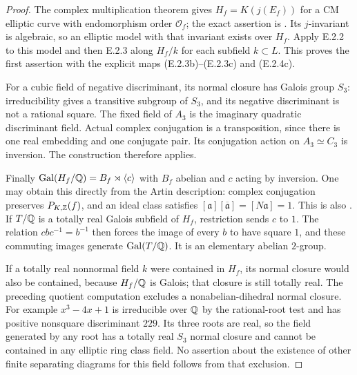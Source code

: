 \begin{proof}
The complex multiplication theorem gives $H_f=K(j(E_f))$ for a CM elliptic curve with endomorphism order $\mathcal O_f$; the exact assertion is \cite[Theorem 11.1, p.~220]{GenCox1989}. Its $j$-invariant is algebraic, so an elliptic model with that invariant exists over $H_f$. Apply E.2.2 to this model and then E.2.3 along $H_f/k$ for each subfield $k\subset L$. This proves the first assertion with the explicit maps (E.2.3b)--(E.2.3c) and (E.2.4c).

For a cubic field of negative discriminant, its normal closure has Galois group $S_3$: irreducibility gives a transitive subgroup of $S_3$, and its negative discriminant is not a rational square. The fixed field of $A_3$ is the imaginary quadratic discriminant field. Actual complex conjugation is a transposition, since there is one real embedding and one conjugate pair. Its conjugation action on $A_3\simeq C_3$ is inversion. The construction therefore applies.

Finally $\operatorname{Gal}(H_f/\mathbb Q)=B_f\rtimes\langle c\rangle$ with $B_f$ abelian and $c$ acting by inversion. One may obtain this directly from the Artin description: complex conjugation preserves $P_{K,\mathbb Z}(f)$, and an ideal class satisfies $[\mathfrak a][\overline{\mathfrak a}]=[N\mathfrak a]=1$. This is also \cite[Lemma 9.3, pp.~180--181]{GenCox1989}. If $T/\mathbb Q$ is a totally real Galois subfield of $H_f$, restriction sends $c$ to $1$. The relation $cbc^{-1}=b^{-1}$ then forces the image of every $b$ to have square $1$, and these commuting images generate $\operatorname{Gal}(T/\mathbb Q)$. It is an elementary abelian $2$-group.

If a totally real nonnormal field $k$ were contained in $H_f$, its normal closure would also be contained, because $H_f/\mathbb Q$ is Galois; that closure is still totally real. The preceding quotient computation excludes a nonabelian-dihedral normal closure. For example $x^3-4x+1$ is irreducible over $\mathbb Q$ by the rational-root test and has positive nonsquare discriminant $229$. Its three roots are real, so the field generated by any root has a totally real $S_3$ normal closure and cannot be contained in any elliptic ring class field. No assertion about the existence of other finite separating diagrams for this field follows from that exclusion.
\end{proof}

